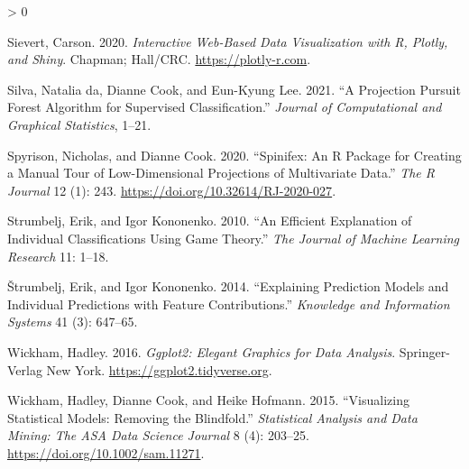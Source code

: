 \documentclass[
]{article}
\newlength{\cslhangindent}
\newenvironment{CSLReferences}[2] %
 {%
  \setlength{\parindent}{0pt}
  \ifodd #1 \everypar{\setlength{\hangindent}{\cslhangindent}}\ignorespaces\fi
  \ifnum #2 > 0
  \setlength{\parskip}{#2\baselineskip}
  \fi
 }%
 {}
\begin{document}
\begin{CSLReferences}{1}{0}
\leavevmode\hypertarget{ref-sievert_interactive_2020}{}%
Sievert, Carson. 2020. \emph{Interactive {Web}-{Based} {Data} {Visualization} with {R}, Plotly, and Shiny}. Chapman; Hall/CRC. \url{https://plotly-r.com}.

\leavevmode\hypertarget{ref-da_silva_projection_2021}{}%
Silva, Natalia da, Dianne Cook, and Eun-Kyung Lee. 2021. {``A {Projection} {Pursuit} {Forest} {Algorithm} for {Supervised} {Classification}.''} \emph{Journal of Computational and Graphical Statistics}, 1--21.

\leavevmode\hypertarget{ref-spyrison_spinifex_2020}{}%
Spyrison, Nicholas, and Dianne Cook. 2020. {``Spinifex: An {R} {Package} for {Creating} a {Manual} {Tour} of {Low}-Dimensional {Projections} of {Multivariate} {Data}.''} \emph{The R Journal} 12 (1): 243. \url{https://doi.org/10.32614/RJ-2020-027}.

\leavevmode\hypertarget{ref-strumbelj_efficient_2010}{}%
Strumbelj, Erik, and Igor Kononenko. 2010. {``An Efficient Explanation of Individual Classifications Using Game Theory.''} \emph{The Journal of Machine Learning Research} 11: 1--18.

\leavevmode\hypertarget{ref-strumbelj_explaining_2014}{}%
Štrumbelj, Erik, and Igor Kononenko. 2014. {``Explaining Prediction Models and Individual Predictions with Feature Contributions.''} \emph{Knowledge and Information Systems} 41 (3): 647--65.

\leavevmode\hypertarget{ref-wickham_ggplot2_2016}{}%
Wickham, Hadley. 2016. \emph{Ggplot2: {Elegant} {Graphics} for {Data} {Analysis}}. Springer-Verlag New York. \url{https://ggplot2.tidyverse.org}.

\leavevmode\hypertarget{ref-wickham_visualizing_2015}{}%
Wickham, Hadley, Dianne Cook, and Heike Hofmann. 2015. {``Visualizing Statistical Models: {Removing} the Blindfold.''} \emph{Statistical Analysis and Data Mining: The ASA Data Science Journal} 8 (4): 203--25. \url{https://doi.org/10.1002/sam.11271}.

\end{CSLReferences}
\end{document}
